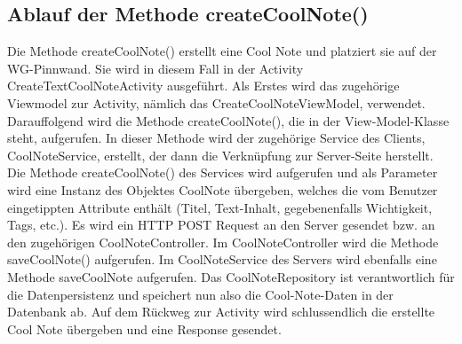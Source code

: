 \subsection{Ablauf der Methode createCoolNote()}

Die Methode createCoolNote() erstellt eine Cool Note und platziert sie auf der WG-Pinnwand. Sie wird in diesem Fall in der Activity CreateTextCoolNoteActivity ausgeführt. Als Erstes wird das zugehörige Viewmodel zur Activity, nämlich das CreateCoolNoteViewModel, verwendet. Darauffolgend wird die Methode createCoolNote(), die in der View-Model-Klasse steht, aufgerufen. In dieser Methode wird der zugehörige Service des Clients, CoolNoteService, erstellt, der dann die Verknüpfung zur Server-Seite herstellt. Die Methode createCoolNote() des Services wird aufgerufen und als Parameter wird eine Instanz des Objektes CoolNote übergeben, welches die vom Benutzer eingetippten Attribute enthält (Titel, Text-Inhalt, gegebenenfalls Wichtigkeit, Tags, etc.). Es wird ein HTTP POST Request an den Server gesendet bzw. an den zugehörigen CoolNoteController. Im CoolNoteController wird die Methode saveCoolNote() aufgerufen. Im CoolNoteService des Servers wird ebenfalls eine Methode saveCoolNote aufgerufen. Das CoolNoteRepository ist verantwortlich für die Datenpersistenz und speichert nun also die Cool-Note-Daten in der Datenbank ab. Auf dem Rückweg zur Activity wird schlussendlich die erstellte Cool Note übergeben und eine Response gesendet.